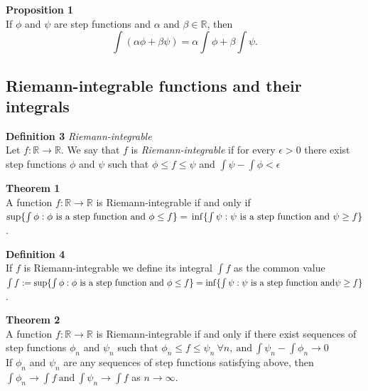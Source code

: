 \documentclass[8pt,landscape]{article}
\begin{document}
\begin{multicols}{3}
    \textbf{Proposition 1} \\
    If $\phi$ and $\psi$ are step functions and $\alpha$ and $\beta \in \mathbb{R}$, then
    \[
        \int(\alpha \phi + \beta \psi) = \alpha \int \phi + \beta \int \psi.
    \]

    \subsection{Riemann-integrable functions and their integrals}

    \textbf{Definition 3} \emph{Riemann-integrable} \\
    Let $f : \mathbb{R} \to \mathbb{R}$.
    We say that $f$ is \emph{Riemann-integrable} if for every $\epsilon > 0$
    there exist step functions $\phi$ and $\psi$ such that
    $\phi \leq f \leq \psi$
    and
    $\int \psi - \int \phi < \epsilon$

    \textbf{Theorem 1} \\
    A function $f : \mathbb{R} \to \mathbb{R}$ is Riemann-integrable if and only if \\
    $\sup \{ \int \phi : \phi \ \text{is a step function and} \ \phi \leq f \} = \\
    \inf \{ \int \psi : \psi \ \text{is a step function and} \ \psi \geq f \}$.

    \textbf{Definition 4} \\
    If $f$ is Riemann-integrable we define its integral $\int f$ as the common value \\
    $\int f := \sup \{ \int \phi : \phi \ \text{is a step function and} \ \phi \leq f \} \\
    = \inf \{ \int \psi : \psi \ \text{is a step function and} \psi \geq f \}$.

    \textbf{Theorem 2} \\
    A function $f : \mathbb{R} \to \mathbb{R}$ is Riemann-integrable if and only if there
    exist sequences of step functions $\phi_n$ and $\psi_n$ such that
    $\phi_n \leq f \leq \psi_n \ \forall n, \ \text{and} \
    \int \psi_n - \int \phi_n \to 0$ \\
    If $\phi_n$ and $\psi_n$ are any sequences of step functions satisfying above, then
    $\int \phi_n \to \int f \ \text{and} \ \int \psi_n \to \int f$
    as $n \to \infty$.


\end{multicols}
\end{document}
